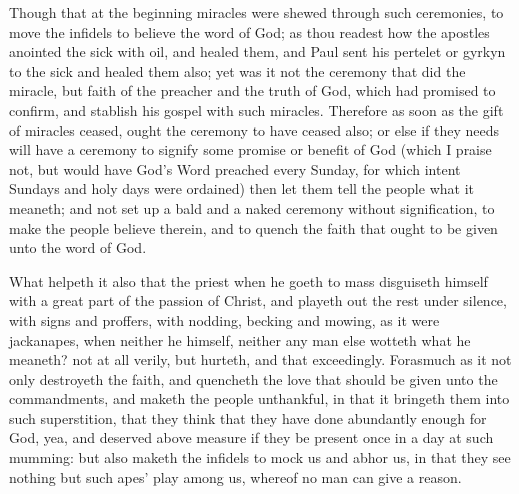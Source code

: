Though that at the beginning miracles were shewed 
through such ceremonies, to move the infidels to believe 
the word of God; as thou readest how the apostles 
anointed the sick with oil, and healed them, and Paul sent 
his pertelet or gyrkyn to the sick and healed them also; 
yet was it not the ceremony that did the miracle, but 
faith of the preacher and the truth of God, which had 
promised to confirm, and stablish his gospel with such 
miracles. Therefore as soon as the gift of miracles 
ceased, ought the ceremony to have ceased also; or else if 
they needs will have a ceremony to signify some promise 
or benefit of God (which I praise not, but would have 
God's Word preached every Sunday, for which intent Sundays
and holy days were ordained) then let them tell the 
people what it meaneth; and not set up a bald and a 
naked ceremony without signification, to make the people 
believe therein, and to quench the faith that ought to be 
given unto the word of God. 

What helpeth it also that the priest when he goeth to 
mass disguiseth himself with a great part of the passion 
of Christ, and playeth out the rest under silence, with 
signs and proffers, with nodding, becking and mowing, 
as it were jackanapes, when neither he himself, neither any 
man else wotteth what he meaneth? not at all verily, but 
hurteth, and that exceedingly. Forasmuch as it not only 
destroyeth the faith, and quencheth the love that should be 
given unto the commandments, and maketh the people 
unthankful, in that it bringeth them into such superstition, 
that they think that they have done abundantly enough for 
God, yea, and deserved above measure if they be present 
once in a day at such mumming: but also maketh the 
infidels to mock us and abhor us, in that they see nothing 
but such apes' play among us, whereof no man can give 
a reason. 

